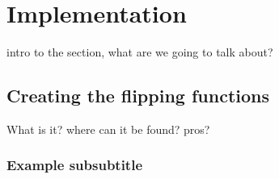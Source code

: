 \section{Implementation}
intro to the section, what are we going to talk about?
\subsection{Creating the flipping functions}
What is it? where can it be found? pros?



\subsubsection{Example subsubtitle}

\newpage
